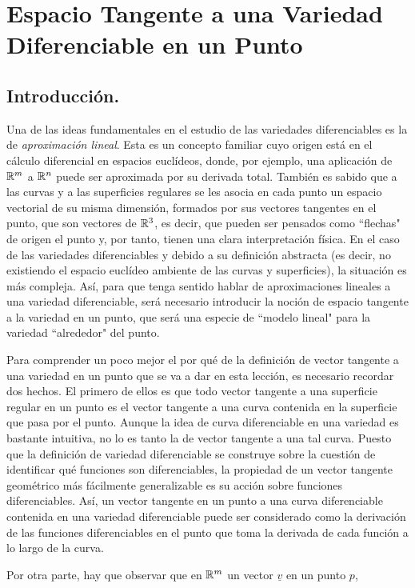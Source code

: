 \documentclass[Cursovd_portada.tex]{subfiles}
\begin{document}
\chapter{Espacio Tangente a una Variedad Diferenciable en un Punto}
\section{Introducción.}
\hs Una de las ideas fundamentales en el estudio de las variedades
diferenciables es la de {\it aproximación lineal}. Esta es un
concepto familiar cuyo origen está en el cálculo
diferencial en espacios euclídeos, donde, por ejemplo, una
aplicación de $\mathbb{R}^m$ a $\mathbb{R}^n$ puede ser aproximada por su
derivada total. También es sabido que a las curvas y a las
superficies regulares se les asocia en cada punto un espacio
vectorial de su misma dimensión, formados por sus vectores
tangentes en el punto, que son vectores de $\mathbb{R}^3$, es decir, que
pueden ser pensados como ``flechas" de origen el punto y, por
tanto, tienen una clara interpretación física. En el caso
de las variedades diferenciables y debido a su definición
abstracta (es decir, no existiendo el espacio euclídeo
ambiente de las curvas y superficies), la situación es más
compleja. Así, para que tenga sentido hablar de
aproximaciones lineales a una variedad diferenciable, será
necesario introducir la noción de espacio tangente a la
variedad en un punto, que será una especie de ``modelo lineal"
para la variedad ``alrededor" del punto.
\par
Para comprender un poco mejor el por qué de la definición  de vector tangente a una variedad en un punto que se va
a dar en esta lección, es necesario recordar dos hechos. El primero de ellos es que todo vector tangente a una
superficie regular en un punto es el vector tangente a una curva contenida en la superficie que pasa por el punto.
Aunque la idea de curva diferenciable en una variedad es bastante intuitiva, no lo es tanto la de vector tangente
a una tal curva. Puesto que la definición de variedad diferenciable se construye sobre la cuestión  de identificar
qué funciones son diferenciables, la propiedad de un vector tangente geométrico más fácilmente generalizable es su
acción sobre funciones diferenciables. Así, un vector tangente en un punto a una curva diferenciable contenida en
una variedad diferenciable puede ser considerado como la derivación de las funciones diferenciables en el punto
que toma la derivada de cada función a lo largo de la curva.
\par
Por otra parte, hay que observar que en $\mathbb{R}^m$ un vector $\underline{v}$ en un punto $p$,
\end{document}
